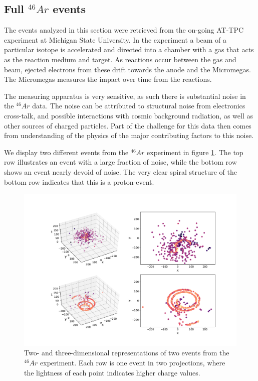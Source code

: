 \subsection{Full \texorpdfstring{${}^{46}Ar$}{46Ar}  events}\label{sec:data_real}

The events analyzed in this section were retrieved from the on-going AT-TPC experiment at Michigan State University. In the experiment a beam of a particular isotope is accelerated and directed into a chamber with a gas that acts as the reaction medium and target. As reactions occur between the gas and beam, ejected electrons from these drift towards the anode and the Micromegas. The Micromegas measures the impact over time from the reactions.

The measuring apparatus is very sensitive, as such there is substantial noise in the ${}^{46}Ar$ data. The noise can be attributed to structural noise from electronics cross-talk, and possible interactions with cosmic background radiation, as well as other sources of charged particles. Part of the challenge for this data then comes from understanding of the physics of the major contributing factors to this noise. 

We display two different events from the ${}^{46}Ar$ experiment in figure \ref{fig:samples}. The top row illustrates an event with a large fraction of noise, while the bottom row shows an event nearly devoid of noise. The very clear spiral structure of the bottom row indicates that this is a proton-event.

\begin{figure}[H]
\centering
\includegraphics[width=\textwidth]{../plots/display_eventsfull_.pdf}
\caption[Displaying un-filtered events in 2D and 3D]{Two- and three-dimensional representations of two events from the ${}^{46}Ar$ experiment. Each row is one event in two projections, where the lightness of each point indicates higher charge values.}\label{fig:samples}
\end{figure}


